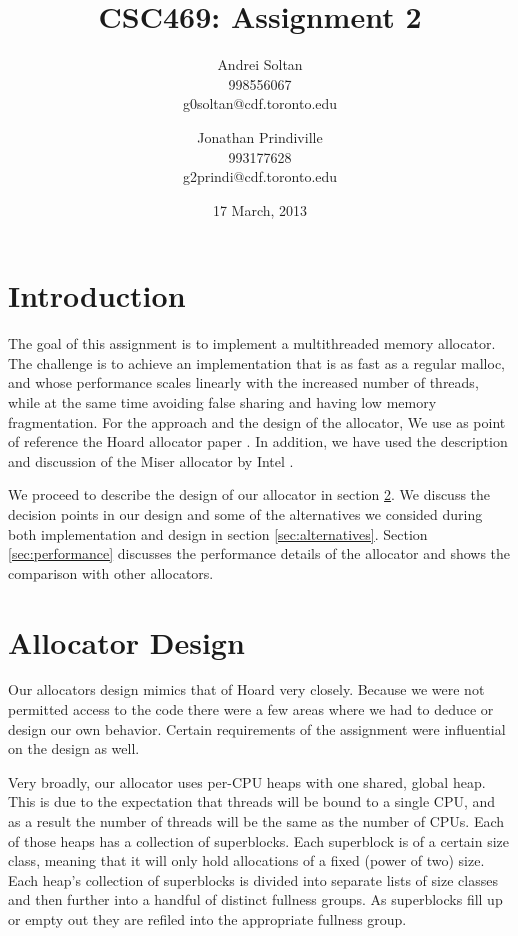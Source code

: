 \documentclass{article}
\author{Andrei Soltan\\998556067\\g0soltan@cdf.toronto.edu
\and Jonathan Prindiville\\993177628\\g2prindi@cdf.toronto.edu}
\title{CSC469: Assignment 2}
\date{17 March, 2013}
\begin{document}
\maketitle

\tableofcontents

\newpage
\section{Introduction}

The goal of this assignment is to implement a multithreaded memory allocator.
The challenge is to achieve an implementation that is as fast as a regular 
malloc, and whose performance scales linearly with the increased number of
threads, while at the same time avoiding false sharing and having low 
memory fragmentation. For the approach and the design of the allocator, 
We use as point of reference the Hoard allocator paper \cite{berger00}.
In addition, we have used the description and discussion of the Miser allocator
by Intel \cite{miser-intel}.

We proceed to describe the design of our allocator in section \ref{sec:design}. 
We discuss the decision points in our design and some of the alternatives we 
consided during both implementation and design in section \ref{sec:alternatives}.
Section \ref{sec:performance} discusses the performance details of the allocator
and shows the comparison with other allocators.

\section{Allocator Design}
\label{sec:design}

Our allocators design mimics that of Hoard \cite{berger00} very closely.
Because we were not permitted access to the code there were a few areas where 
we had to deduce or design our own behavior. Certain requirements of the 
assignment were influential on the design as well.

Very broadly, our allocator uses per-CPU heaps with one shared, global heap.
This is due to the expectation that threads will be bound to a single CPU,
and as a result the number of threads will be the same as the number of CPUs.
Each of those heaps has a collection of superblocks. Each superblock is of a
certain size class, meaning that it will only hold allocations of a fixed
(power of two) size. Each heap's collection of superblocks is divided into
separate lists of size classes and then further into a handful of distinct
fullness groups. As superblocks fill up or empty out they are refiled into
the appropriate fullness group.
\end{document}
